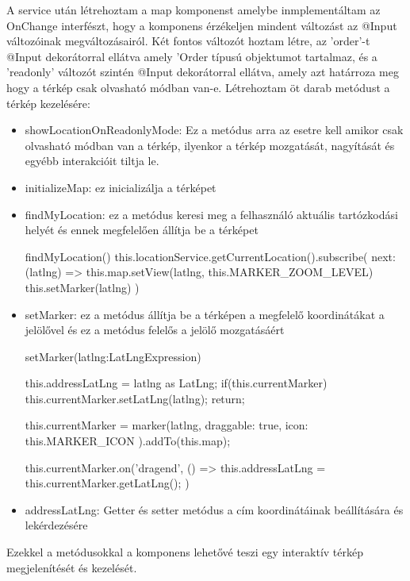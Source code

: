 A service után létrehoztam a map komponenst amelybe inmplementáltam az OnChange interfészt, hogy a komponens érzékeljen mindent változást az @Input változóinak megváltozásairól. Két fontos változót hoztam létre, az ’order’-t @Input dekorátorral ellátva amely ’Order típusú objektumot tartalmaz, és a ’readonly’ változót szintén @Input dekorátorral ellátva, amely azt határroza meg hogy a térkép csak olvasható módban van-e. Létrehoztam öt darab metódust a térkép kezelésére:
\begin{itemize}
    \item showLocationOnReadonlyMode: Ez a metódus arra az esetre kell amikor csak olvasható módban van a térkép, ilyenkor a térkép mozgatását, nagyítását és egyébb interakcióit tiltja le.
    \item initializeMap: ez inicializálja a térképet
    \item findMyLocation: ez a metódus keresi meg a felhasználó aktuális tartózkodási helyét és ennek megfelelően állítja be a térképet
    \begin{python}[caption={Megadja felhasználó aktuális pozícióját},captionpos=b]
    findMyLocation(){
    this.locationService.getCurrentLocation().subscribe({
      next: (latlng) => {
        this.map.setView(latlng, this.MARKER_ZOOM_LEVEL)
        this.setMarker(latlng)
      }
    })
  }
    \end{python}
    \item setMarker: ez a metódus állítja be a térképen a megfelelő koordinátákat a jelölővel és ez a metódus felelős a jelölő mozgatásáért
    \begin{python}[caption={A felhasználó lokációjára egy jelölőt rak},captionpos=b]
    setMarker(latlng:LatLngExpression){
    this.addressLatLng = latlng as LatLng;
    if(this.currentMarker){
      this.currentMarker.setLatLng(latlng);
      return;
    }

    this.currentMarker = marker(latlng, {
      draggable: true,
      icon: this.MARKER_ICON
    }).addTo(this.map);

    this.currentMarker.on('dragend', () => {
      this.addressLatLng = this.currentMarker.getLatLng();
    })
    }
    \end{python}
    \item addressLatLng: Getter és setter metódus a cím koordinátáinak beállítására és lekérdezésére
\end{itemize}

Ezekkel a metódusokkal a komponens lehetővé teszi egy interaktív térkép megjelenítését és kezelését.